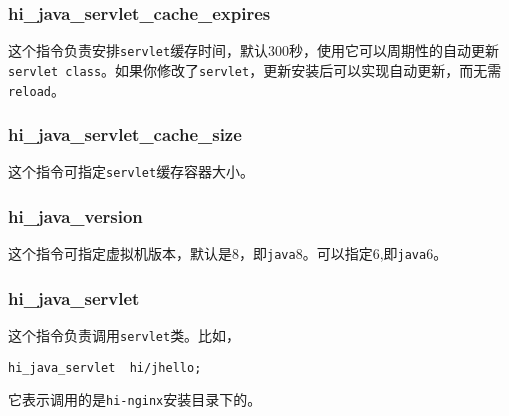 \subsubsection{hi_java_servlet_cache_expires}
这个指令负责安排\texttt{servlet}缓存时间，默认300秒，使用它可以周期性的自动更新\texttt{servlet class}。如果你修改了\texttt{servlet}，更新安装后可以实现自动更新，而无需\texttt{reload}。
\subsubsection{hi_java_servlet_cache_size}
这个指令可指定\texttt{servlet}缓存容器大小。
\subsubsection{hi_java_version}
这个指令可指定虚拟机版本，默认是8，即\texttt{java}8。可以指定6,即\texttt{java}6。
\subsubsection{hi_java_servlet}
这个指令负责调用\texttt{servlet}类。比如，
\begin{lstlisting}
hi_java_servlet  hi/jhello;
\end{lstlisting}
它表示调用的是\texttt{hi-nginx}安装目录下的。














